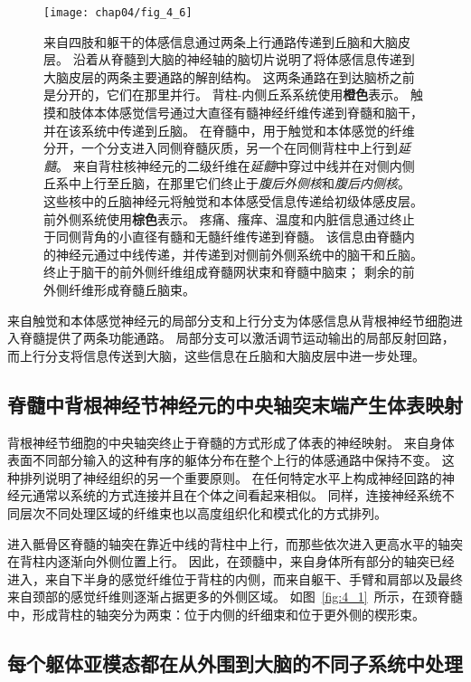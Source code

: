 \begin{figure}[htbp]
	\centering
	\texttt{[image: chap04/fig\_4\_6]}
	\caption{来自四肢和躯干的体感信息通过两条上行通路传递到丘脑和大脑皮层。
		沿着从脊髓到大脑的神经轴的脑切片说明了将体感信息传递到大脑皮层的两条主要通路的解剖结构。
		这两条通路在到达脑桥之前是分开的，它们在那里并行。
		背柱-内侧丘系系统使用\textbf{橙色}表示。
		触摸和肢体本体感觉信号通过大直径有髓神经纤维传递到脊髓和脑干，并在该系统中传递到丘脑。
		在脊髓中，用于触觉和本体感觉的纤维分开，一个分支进入同侧脊髓灰质，另一个在同侧背柱中上行到\textit{延髓}。 
		来自背柱核神经元的二级纤维在\textit{延髓}中穿过中线并在对侧内侧丘系中上行至丘脑，在那里它们终止于\textit{腹后外侧核}和\textit{腹后内侧核}。
		这些核中的丘脑神经元将触觉和本体感受信息传递给初级体感皮层。
		前外侧系统使用\textbf{棕色}表示。
		疼痛、瘙痒、温度和内脏信息通过终止于同侧背角的小直径有髓和无髓纤维传递到脊髓。
		该信息由脊髓内的神经元通过中线传递，并传递到对侧前外侧系统中的脑干和丘脑。
		终止于脑干的前外侧纤维组成脊髓网状束和脊髓中脑束；
		剩余的前外侧纤维形成脊髓丘脑束。}
	\label{fig:4_6}
\end{figure}


来自触觉和本体感觉神经元的局部分支和上行分支为体感信息从背根神经节细胞进入脊髓提供了两条功能通路。
局部分支可以激活调节运动输出的局部反射回路，而上行分支将信息传送到大脑，这些信息在丘脑和大脑皮层中进一步处理。



\subsection{脊髓中背根神经节神经元的中央轴突末端产生体表映射}

背根神经节细胞的中央轴突终止于脊髓的方式形成了体表的神经映射。
来自身体表面不同部分输入的这种有序的躯体分布在整个上行的体感通路中保持不变。
这种排列说明了神经组织的另一个重要原则。
在任何特定水平上构成神经回路的神经元通常以系统的方式连接并且在个体之间看起来相似。 
同样，连接神经系统不同层次不同处理区域的纤维束也以高度组织化和模式化的方式排列。


进入骶骨区脊髓的轴突在靠近中线的背柱中上行，而那些依次进入更高水平的轴突在背柱内逐渐向外侧位置上行。 
因此，在颈髓中，来自身体所有部分的轴突已经进入，来自下半身的感觉纤维位于背柱的内侧，而来自躯干、手臂和肩部以及最终来自颈部的感觉纤维则逐渐占据更多的外侧区域。
如图~\ref{fig:4_1}~所示，在颈脊髓中，形成背柱的轴突分为两束：位于内侧的纤细束和位于更外侧的楔形束。



\subsection{每个躯体亚模态都在从外围到大脑的不同子系统中处理}

